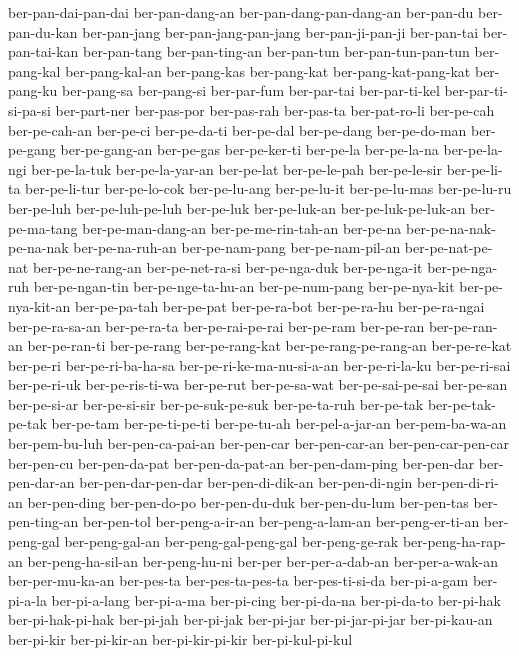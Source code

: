 {ber-pan-dai-pan-dai ber-pan-dang-an ber-pan-dang-pan-dang-an ber-pan-du
ber-pan-du-kan ber-pan-jang ber-pan-jang-pan-jang ber-pan-ji-pan-ji
ber-pan-tai ber-pan-tai-kan ber-pan-tang ber-pan-ting-an ber-pan-tun
ber-pan-tun-pan-tun ber-pang-kal ber-pang-kal-an ber-pang-kas ber-pang-kat
ber-pang-kat-pang-kat ber-pang-ku ber-pang-sa ber-pang-si ber-par-fum
ber-par-tai ber-par-ti-kel ber-par-ti-si-pa-si ber-part-ner ber-pas-por
ber-pas-rah ber-pas-ta ber-pat-ro-li ber-pe-cah ber-pe-cah-an ber-pe-ci
ber-pe-da-ti ber-pe-dal ber-pe-dang ber-pe-do-man ber-pe-gang
ber-pe-gang-an ber-pe-gas ber-pe-ker-ti ber-pe-la ber-pe-la-na
ber-pe-la-ngi ber-pe-la-tuk ber-pe-la-yar-an ber-pe-lat ber-pe-le-pah
ber-pe-le-sir ber-pe-li-ta ber-pe-li-tur ber-pe-lo-cok ber-pe-lu-ang
ber-pe-lu-it ber-pe-lu-mas ber-pe-lu-ru ber-pe-luh ber-pe-luh-pe-luh
ber-pe-luk ber-pe-luk-an ber-pe-luk-pe-luk-an ber-pe-ma-tang
ber-pe-man-dang-an ber-pe-me-rin-tah-an ber-pe-na ber-pe-na-nak-pe-na-nak
ber-pe-na-ruh-an ber-pe-nam-pang ber-pe-nam-pil-an ber-pe-nat-pe-nat
ber-pe-ne-rang-an ber-pe-net-ra-si ber-pe-nga-duk ber-pe-nga-it
ber-pe-nga-ruh ber-pe-ngan-tin ber-pe-nge-ta-hu-an ber-pe-num-pang
ber-pe-nya-kit ber-pe-nya-kit-an ber-pe-pa-tah ber-pe-pat ber-pe-ra-bot
ber-pe-ra-hu ber-pe-ra-ngai ber-pe-ra-sa-an ber-pe-ra-ta ber-pe-rai-pe-rai
ber-pe-ram ber-pe-ran ber-pe-ran-an ber-pe-ran-ti ber-pe-rang
ber-pe-rang-kat ber-pe-rang-pe-rang-an ber-pe-re-kat ber-pe-ri
ber-pe-ri-ba-ha-sa ber-pe-ri-ke-ma-nu-si-a-an ber-pe-ri-la-ku
ber-pe-ri-sai ber-pe-ri-uk ber-pe-ris-ti-wa ber-pe-rut ber-pe-sa-wat
ber-pe-sai-pe-sai ber-pe-san ber-pe-si-ar ber-pe-si-sir ber-pe-suk-pe-suk
ber-pe-ta-ruh ber-pe-tak ber-pe-tak-pe-tak ber-pe-tam ber-pe-ti-pe-ti
ber-pe-tu-ah ber-pel-a-jar-an ber-pem-ba-wa-an ber-pem-bu-luh
ber-pen-ca-pai-an ber-pen-car ber-pen-car-an ber-pen-car-pen-car
ber-pen-cu ber-pen-da-pat ber-pen-da-pat-an ber-pen-dam-ping ber-pen-dar
ber-pen-dar-an ber-pen-dar-pen-dar ber-pen-di-dik-an ber-pen-di-ngin
ber-pen-di-ri-an ber-pen-ding ber-pen-do-po ber-pen-du-duk ber-pen-du-lum
ber-pen-tas ber-pen-ting-an ber-pen-tol ber-peng-a-ir-an ber-peng-a-lam-an
ber-peng-er-ti-an ber-peng-gal ber-peng-gal-an ber-peng-gal-peng-gal
ber-peng-ge-rak ber-peng-ha-rap-an ber-peng-ha-sil-an ber-peng-hu-ni
ber-per ber-per-a-dab-an ber-per-a-wak-an ber-per-mu-ka-an ber-pes-ta
ber-pes-ta-pes-ta ber-pes-ti-si-da ber-pi-a-gam ber-pi-a-la ber-pi-a-lang
ber-pi-a-ma ber-pi-cing ber-pi-da-na ber-pi-da-to ber-pi-hak
ber-pi-hak-pi-hak ber-pi-jah ber-pi-jak ber-pi-jar ber-pi-jar-pi-jar
ber-pi-kau-an ber-pi-kir ber-pi-kir-an ber-pi-kir-pi-kir ber-pi-kul-pi-kul
}
